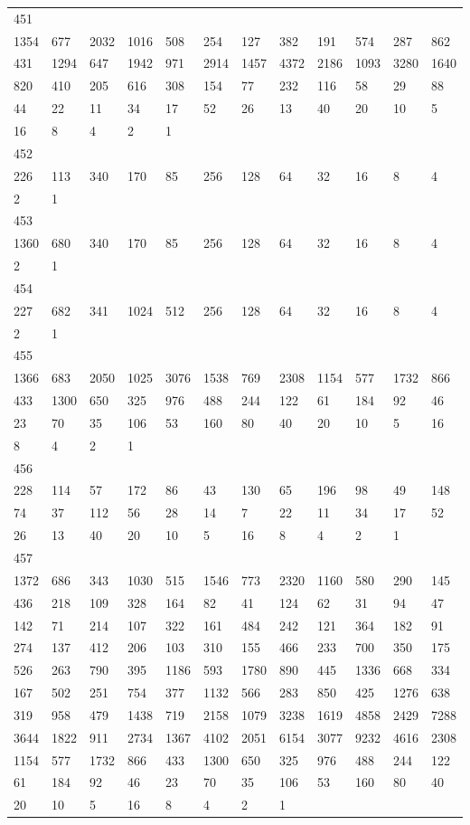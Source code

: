 \begin{longtable}{llllllllllll}
451&&&&&&&&&&&\\
1354& 677& 2032& 1016& 508& 254& 127& 382& 191& 574& 287& 862\\
431& 1294& 647& 1942& 971& 2914& 1457& 4372& 2186& 1093& 3280& 1640\\
820& 410& 205& 616& 308& 154& 77& 232& 116& 58& 29& 88\\
44& 22& 11& 34& 17& 52& 26& 13& 40& 20& 10& 5\\
16& 8& 4& 2& 1& \\

452&&&&&&&&&&&\\
226& 113& 340& 170& 85& 256& 128& 64& 32& 16& 8& 4\\
2& 1& \\

453&&&&&&&&&&&\\
1360& 680& 340& 170& 85& 256& 128& 64& 32& 16& 8& 4\\
2& 1& \\

454&&&&&&&&&&&\\
227& 682& 341& 1024& 512& 256& 128& 64& 32& 16& 8& 4\\
2& 1& \\

455&&&&&&&&&&&\\
1366& 683& 2050& 1025& 3076& 1538& 769& 2308& 1154& 577& 1732& 866\\
433& 1300& 650& 325& 976& 488& 244& 122& 61& 184& 92& 46\\
23& 70& 35& 106& 53& 160& 80& 40& 20& 10& 5& 16\\
8& 4& 2& 1& \\

456&&&&&&&&&&&\\
228& 114& 57& 172& 86& 43& 130& 65& 196& 98& 49& 148\\
74& 37& 112& 56& 28& 14& 7& 22& 11& 34& 17& 52\\
26& 13& 40& 20& 10& 5& 16& 8& 4& 2& 1& \\

457&&&&&&&&&&&\\
1372& 686& 343& 1030& 515& 1546& 773& 2320& 1160& 580& 290& 145\\
436& 218& 109& 328& 164& 82& 41& 124& 62& 31& 94& 47\\
142& 71& 214& 107& 322& 161& 484& 242& 121& 364& 182& 91\\
274& 137& 412& 206& 103& 310& 155& 466& 233& 700& 350& 175\\
526& 263& 790& 395& 1186& 593& 1780& 890& 445& 1336& 668& 334\\
167& 502& 251& 754& 377& 1132& 566& 283& 850& 425& 1276& 638\\
319& 958& 479& 1438& 719& 2158& 1079& 3238& 1619& 4858& 2429& 7288\\
3644& 1822& 911& 2734& 1367& 4102& 2051& 6154& 3077& 9232& 4616& 2308\\
1154& 577& 1732& 866& 433& 1300& 650& 325& 976& 488& 244& 122\\
61& 184& 92& 46& 23& 70& 35& 106& 53& 160& 80& 40\\
20& 10& 5& 16& 8& 4& 2& 1& \\


\end{longtable}
